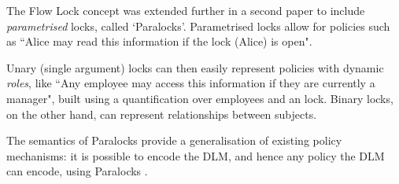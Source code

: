 The Flow Lock concept was extended further in a second paper \cite{broberg2010paralocks} to include \textit{parametrised} locks, called `Paralocks'. Parametrised locks allow for policies such as ``Alice may read this information if the lock (Alice) is open".

Unary (single argument) locks can then easily represent policies with dynamic \textit{roles}, like ``Any employee may access this information if they are currently a manager", built using a quantification over employees and an  lock. Binary locks, on the other hand, can represent relationships between subjects.

The semantics of Paralocks provide a generalisation of existing policy mechanisms: it is possible to encode the DLM, and hence any policy the DLM can encode, using Paralocks \cite{broberg2010paralocks}.
%
%
%
%
%
%
%
%

%
%
%
%
%




